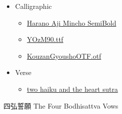 \documentclass[letterpaper]{article}
\begin{document}
\vspace*{1cm}

\begin{itemize}
	\item[] {\LARGE Calligraphic}
	\begin{itemize}
		\item[] \href{https://gwmatthews.github.io/the-four-vows-HaranoAjiMinchoSB.pdf}{Harano Aji Mincho SemiBold}
		\item[] \href{https://gwmatthews.github.io/the-four-vows-YOzM90.pdf}{YOzM90.ttf}
		\item[] \href{https://gwmatthews.github.io/the-four-vows-KouzanGyousho.pdf}{KouzanGyoushoOTF.otf}
	\end{itemize}
\end{itemize}
\vspace*{1cm}

\begin{itemize}
\item[] {\LARGE Verse}
\begin{itemize}
	\item[] \href{https://gwmatthews.github.io/verse-test.pdf}{two haiku and the heart sutra}
	
\end{itemize}

\end{itemize}
	
	
	
	
	\vfill\eject\pagebreak
	
\centering 四弘誓願 The Four Bodhisattva Vows
\end{document}
